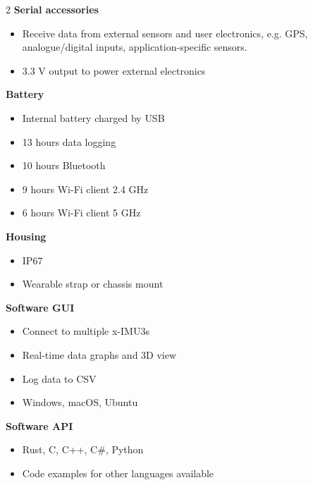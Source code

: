 \begin{multicols}{2}
\textbf{Serial accessories}
\begin{itemize}[nolistsep]
    \item Receive data from external sensors and user electronics, e.g. \acs{GPS}, analogue/digital inputs, application-specific sensors.
    \item 3.3 V output to power external electronics
\end{itemize}

\textbf{Battery}
\begin{itemize}[nolistsep]
    \item Internal battery charged by \acs{USB}
    \item 13 hours data logging
    \item 10 hours Bluetooth
    \item 9 hours Wi-Fi client 2.4 GHz
    \item 6 hours Wi-Fi client 5 GHz
\end{itemize}

\textbf{Housing}
\begin{itemize}[nolistsep]
    \item \acs{IP67}
    \item Wearable strap or chassis mount
\end{itemize}

\textbf{Software \acs{GUI}}
\begin{itemize}[nolistsep]
    \item Connect to multiple x-IMU3s
    \item Real-time data graphs and 3D view
    \item Log data to \acs{CSV}
    \item Windows, macOS, Ubuntu
\end{itemize}

\textbf{Software \acs{API}}
\begin{itemize}[nolistsep]
    \item Rust, C, C++, C\#, Python
    \item Code examples for other languages available
\end{itemize}

\end{multicols}

\clearpage
